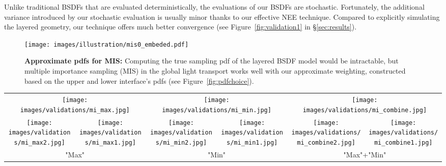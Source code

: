 Unlike traditional BSDFs that are evaluated deterministically, the evaluations of our BSDFs are stochastic.
Fortunately, the additional variance introduced by our stochastic evaluation is usually minor thanks to our effective NEE technique.
Compared to explicitly simulating the layered geometry, our technique offers much better convergence (see Figure~\ref{fig:validation1} in \S\ref{sec:results}).

\begin{figure}[t]
	\centering
	\texttt{[image: images/illustration/mis0\_embeded.pdf]}
	\caption{\label{fig:mis0}
		\textbf{Approximate pdfs for MIS:} Computing the true sampling pdf of the layered BSDF model would be intractable, but multiple importance sampling (MIS) in the global light transport works well with our approximate weighting, constructed based on the upper and lower interface's pdfs (see Figure~\protect\ref{fig:pdfchoice}).}
\end{figure}

\begin{figure*}[t]
	\centering
	\addtolength{\tabcolsep}{-4pt}
	\begin{tabular}{cccccc}
		\multicolumn{2}{c}{\texttt{[image: images/validations/mi\_max.jpg]}} & 
		\multicolumn{2}{c}{\texttt{[image: images/validations/mi\_min.jpg]}} & 
		\multicolumn{2}{c}{\texttt{[image: images/validations/mi\_combine.jpg]}} \\
		\texttt{[image: images/validations/mi\_max2.jpg]} & 
		\texttt{[image: images/validations/mi\_max1.jpg]} & 
		\texttt{[image: images/validations/mi\_min2.jpg]} & 
		\texttt{[image: images/validations/mi\_min1.jpg]} & 
		\texttt{[image: images/validations/mi\_combine2.jpg]} & 
		\texttt{[image: images/validations/mi\_combine1.jpg]} \\
		\multicolumn{2}{c}{"Max"} & \multicolumn{2}{c}{"Min"} & \multicolumn{2}{c}{"Max"+"Min"}
	\end{tabular}
	\caption{\label{fig:pdfchoice}
		\textbf{Approximate pdf weighting heuristics:}
		The ``max'' heuristic works well except if the light source is small and/or top interface roughness is larger than bottom roughness, and the``min'' heuristic works exactly in the opposite way. Combining them leads to a more robust heuristic.
	}
\end{figure*}	

